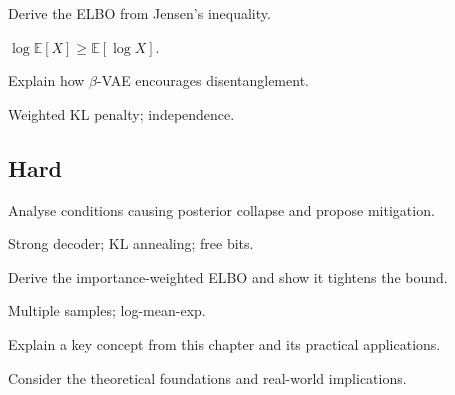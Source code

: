 \begin{exercisebox}[medium]
\begin{problem}
Derive the ELBO from Jensen's inequality.
\end{problem}
\begin{hintbox}
$\log \mathbb{E}[X] \geq \mathbb{E}[\log X]$.
\end{hintbox}
\end{exercisebox}


\begin{exercisebox}[medium]
\begin{problem}
Explain how $\beta$-VAE encourages disentanglement.
\end{problem}
\begin{hintbox}
Weighted KL penalty; independence.
\end{hintbox}
\end{exercisebox}


\subsection*{Hard}

\begin{exercisebox}[hard]
\begin{problem}
Analyse conditions causing posterior collapse and propose mitigation.
\end{problem}
\begin{hintbox}
Strong decoder; KL annealing; free bits.
\end{hintbox}
\end{exercisebox}


\begin{exercisebox}[hard]
\begin{problem}
Derive the importance-weighted ELBO and show it tightens the bound.
\end{problem}
\begin{hintbox}
Multiple samples; log-mean-exp.
\end{hintbox}
\end{exercisebox}



\begin{exercisebox}[hard]
\begin{problem}
Explain a key concept from this chapter and its practical applications.
\end{problem}
\begin{hintbox}
Consider the theoretical foundations and real-world implications.
\end{hintbox}
\end{exercisebox}


